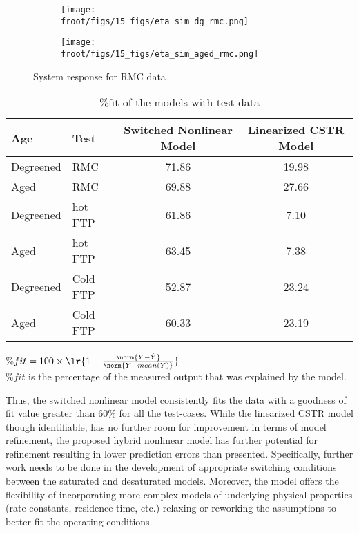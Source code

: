 \begin{figure}[H]
        \begin{minipage}{0.49\textwidth}
                \begin{figure}[H]
                        \centering
                        \texttt{[image: \\froot/figs/15\_figs/eta\_sim\_dg\_rmc.png]}
                \end{figure}
        \end{minipage}
        \begin{minipage}{0.49\textwidth}
                \begin{figure}[H]
                        \centering
                        \texttt{[image: \\froot/figs/15\_figs/eta\_sim\_aged\_rmc.png]}
                \end{figure}
        \end{minipage}
        \caption{System response for RMC data}
\end{figure}


\begin{table}[H]
        \centering
        \caption{$\%$fit of the models with test data}
        \label{tab::results}
        \begin{tabular}{l l c c}
                \hline \hline
                Age & Test & Switched Nonlinear Model & Linearized CSTR Model \\ \hline \hline
                Degreened & RMC & 71.86 & 19.98 \\
                Aged      & RMC & 69.88 & 27.66 \\ \hline
                Degreened & hot FTP & 61.86 & 7.10 \\
                Aged      & hot FTP & 63.45 & 7.38 \\ \hline
                Degreened & Cold FTP & 52.87 & 23.24 \\
                Aged      & Cold FTP & 60.33 & 23.19 \\ \hline
                \hline
        \end{tabular}

        $\%fit = 100 \times \lr{1 - \frac{\norm{Y- \hat Y}}{\norm{Y -
        mean(Y)}}}$ \\
        $\%fit$ is the percentage of the measured output that was explained by the
        model.
\end{table}

Thus, the switched nonlinear model consistently fits the data with a goodness of fit value greater than $60\%$ for all
the test-cases. While the linearized CSTR model though identifiable, has no further room for improvement in terms of
model refinement, the proposed hybrid nonlinear model has further potential for refinement resulting in lower prediction
errors than presented. Specifically, further work needs to be done in the development of appropriate switching
conditions between the saturated and desaturated models. Moreover, the model offers the flexibility of incorporating
more complex models of underlying physical properties (rate-constants, residence time, etc.) relaxing or reworking the
assumptions to better fit the operating conditions.
